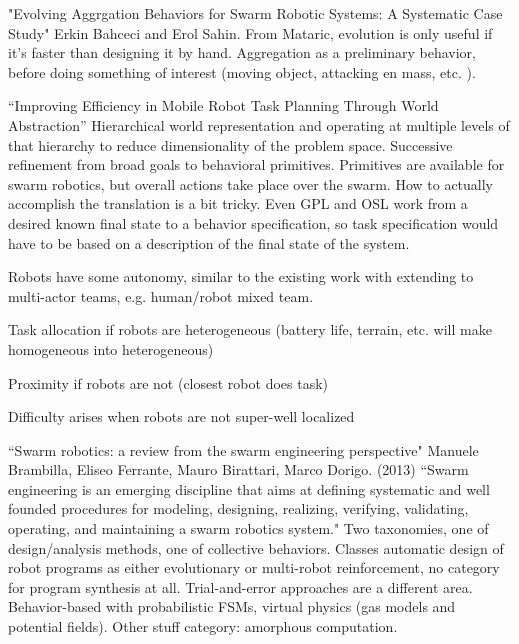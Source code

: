 \documentclass[]{article}
\begin{document}
"Evolving Aggrgation Behaviors for Swarm Robotic Systems: A Systematic Case Study" \cite{bahgecci2005evolving} Erkin Bahceci and Erol Sahin. From Mataric, evolution is only useful if it's faster than designing it by hand. Aggregation as a preliminary behavior, before doing something of interest (moving object, attacking en mass, etc. ).


``Improving Efficiency in Mobile Robot Task Planning Through World Abstraction'' \cite{galindo2004improving} Hierarchical world representation and operating at multiple levels of that hierarchy to reduce dimensionality of the problem space. Successive refinement from broad goals to behavioral primitives. Primitives are available for swarm robotics, but overall actions take place over the swarm. How to actually accomplish the translation is a bit tricky. Even GPL and OSL work from a desired known final state to a behavior specification, so task specification would have to be based on a description of the final state of the system. 

Robots have some autonomy, similar to the existing work with extending to multi-actor teams, e.g. human/robot mixed team. 

Task allocation if robots are heterogeneous (battery life, terrain, etc. will make homogeneous into heterogeneous)

Proximity if robots are not (closest robot does task)

Difficulty arises when robots are not super-well localized

``Swarm robotics: a review from the swarm engineering perspective" \cite{brambilla2013swarm} Manuele Brambilla, Eliseo Ferrante, Mauro Birattari, Marco Dorigo. (2013) ``Swarm engineering is an emerging discipline that aims at defining systematic and well founded procedures for modeling, designing, realizing, verifying, validating, operating, and maintaining a swarm robotics system." Two taxonomies, one of design/analysis methods, one of collective behaviors. Classes automatic design of robot programs as either evolutionary or multi-robot reinforcement, no category for program synthesis at all. Trial-and-error approaches are a different area. Behavior-based with probabilistic FSMs, virtual physics (gas models and potential fields). Other stuff category: amorphous computation. 
\end{document}
